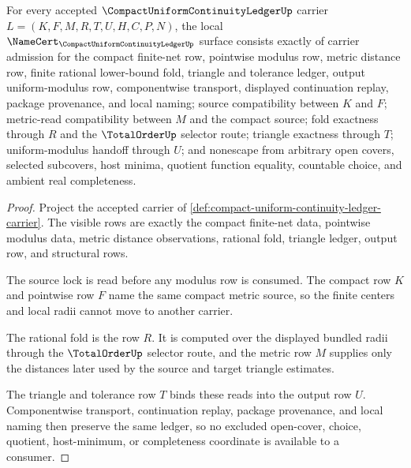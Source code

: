 \begin{theorem}
\label{thm:compact-uniform-continuity-ledger-namecert-obligations}
For every accepted $\CompactUniformContinuityLedgerUp$ carrier $L=(K,F,M,R,T,U,H,C,P,N)$, the local $\NameCert_{\CompactUniformContinuityLedgerUp}$ surface consists exactly of carrier admission for the compact finite-net row, pointwise modulus row, metric distance row, finite rational lower-bound fold, triangle and tolerance ledger, output uniform-modulus row, componentwise transport, displayed continuation replay, package provenance, and local naming; source compatibility between $K$ and $F$; metric-read compatibility between $M$ and the compact source; fold exactness through $R$ and the $\TotalOrderUp$ selector route; triangle exactness through $T$; uniform-modulus handoff through $U$; and nonescape from arbitrary open covers, selected subcovers, host minima, quotient function equality, countable choice, and ambient real completeness.
\end{theorem}
\begin{proof}
Project the accepted carrier of \autoref{def:compact-uniform-continuity-ledger-carrier}. The visible rows are exactly the compact finite-net data, pointwise modulus data, metric distance observations, rational fold, triangle ledger, output row, and structural rows.

The source lock is read before any modulus row is consumed. The compact row $K$ and pointwise row $F$ name the same compact metric source, so the finite centers and local radii cannot move to another carrier.

The rational fold is the row $R$. It is computed over the displayed bundled radii through the $\TotalOrderUp$ selector route, and the metric row $M$ supplies only the distances later used by the source and target triangle estimates.

The triangle and tolerance row $T$ binds these reads into the output row $U$. Componentwise transport, continuation replay, package provenance, and local naming then preserve the same ledger, so no excluded open-cover, choice, quotient, host-minimum, or completeness coordinate is available to a consumer.
\end{proof}

